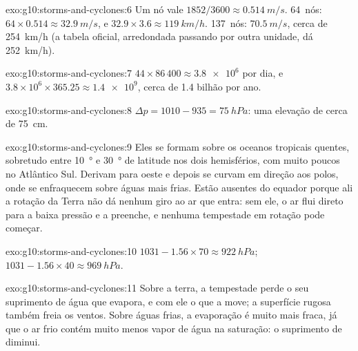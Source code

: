 \begin{solution}{exo:g10:storms-and-cyclones:6}
Um nó vale $1852/3600 \approx \qty{0.514}{m/s}$. \num{64}~nós: $64 \times
0.514 \approx \qty{32.9}{m/s}$, e $32.9 \times 3.6 \approx
\qty{119}{km/h}$. \num{137}~nós: $\qty{70.5}{m/s}$, cerca de
\qty{254}{km/h} (a tabela oficial, arredondada passando por outra unidade,
dá \qty{252}{km/h}).
\end{solution}

\begin{solution}{exo:g10:storms-and-cyclones:7}
$44 \times 86\,400 \approx \num{3.8e6}$  por dia, e $3.8\times10^6
\times 365.25 \approx \num{1.4e9}$, cerca de 1.4 bilhão por ano.
\end{solution}

\begin{solution}{exo:g10:storms-and-cyclones:8}
$\Delta p = 1010 - 935 = \qty{75}{hPa}$: uma elevação de cerca de
\qty{75}{cm}.
\end{solution}

\begin{solution}{exo:g10:storms-and-cyclones:9}
Eles se formam sobre os oceanos tropicais quentes, sobretudo entre
\qty{10}{\degree} e \qty{30}{\degree} de latitude nos dois hemisférios, com
muito poucos no Atlântico Sul. Derivam para oeste e depois se curvam em
direção aos polos, onde se enfraquecem sobre águas mais frias. Estão
ausentes do equador porque ali a rotação da Terra não dá nenhum giro ao ar
que entra: sem ele, o ar flui direto para a baixa pressão e a preenche, e
nenhuma tempestade em rotação pode começar.
\end{solution}

\begin{solution}{exo:g10:storms-and-cyclones:10}
$1031 - 1.56 \times 70 \approx \qty{922}{hPa}$; $1031 - 1.56 \times 40
\approx \qty{969}{hPa}$.
\end{solution}

\begin{solution}{exo:g10:storms-and-cyclones:11}
Sobre a terra, a tempestade perde o seu suprimento de água que evapora, e
com ele o  que a move; a superfície rugosa também freia os
ventos. Sobre águas frias, a evaporação é muito mais fraca, já que o ar frio
contém muito menos vapor de água na saturação: o suprimento de 
diminui.
\end{solution}

